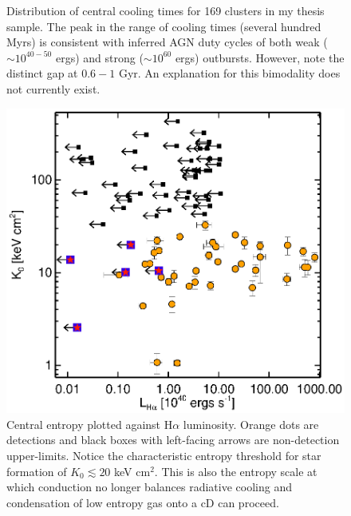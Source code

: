\documentclass[11pt]{article}
\begin{document}
\begin{figure}[t]
\begin{minipage}[t]{0.5\linewidth}
        \caption{\small Distribution of central cooling times for 169
	clusters in my thesis sample. The peak in the range of cooling
	times (several hundred Myrs) is consistent with inferred AGN
	duty cycles of both weak ($\sim 10^{40-50}$ ergs) and strong ($\sim
	10^{60}$ ergs) outbursts. However, note the distinct gap at $0.6-1$
	Gyr. An explanation for this bimodality does not currently exist.}
	\label{fig:tcool}
    \end{minipage}
    \hspace{0.1cm}
    \begin{minipage}[t]{0.5\linewidth}
        \centering
        \includegraphics*[width=\textwidth, trim=28mm 8mm 30mm 10mm, clip]{ha_k0}
        \caption{\small Central entropy plotted against H$\alpha$
	luminosity. Orange dots are detections and black boxes with left-facing
	arrows are non-detection upper-limits. Notice the characteristic entropy threshold for star
	formation of $K_0 \lesssim 20$ keV cm$^2$. This is also the entropy scale at
	which conduction no longer balances radiative cooling and condensation
	of low entropy gas onto a cD can proceed.}
        \label{fig:ha}
    \end{minipage}
    \hspace{0.1in}
    \begin{minipage}[t]{0.5\linewidth}
        \centering

\end{minipage}
\end{figure}
\end{document}
